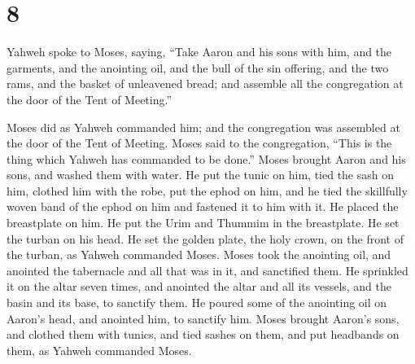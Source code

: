 \hypertarget{section-7}{%
\section{8}\label{section-7}}

 Yahweh spoke to Moses, saying,  ``Take
Aaron and his sons with him, and the garments, and the anointing oil,
and the bull of the sin offering, and the two rams, and the basket of
unleavened bread;  and assemble all the congregation at
the door of the Tent of Meeting.''

 Moses did as Yahweh commanded him; and the congregation
was assembled at the door of the Tent of Meeting.  Moses
said to the congregation, ``This is the thing which Yahweh has commanded
to be done.''  Moses brought Aaron and his sons, and
washed them with water.  He put the tunic on him, tied the
sash on him, clothed him with the robe, put the ephod on him, and he
tied the skillfully woven band of the ephod on him and fastened it to
him with it.  He placed the breastplate on him. He put the
Urim and Thummim in the breastplate.  He set the turban on
his head. He set the golden plate, the holy crown, on the front of the
turban, as Yahweh commanded Moses.  Moses took the
anointing oil, and anointed the tabernacle and all that was in it, and
sanctified them.  He sprinkled it on the altar seven
times, and anointed the altar and all its vessels, and the basin and its
base, to sanctify them.  He poured some of the anointing
oil on Aaron's head, and anointed him, to sanctify him. 
Moses brought Aaron's sons, and clothed them with tunics, and tied
sashes on them, and put headbands on them, as Yahweh commanded Moses.

